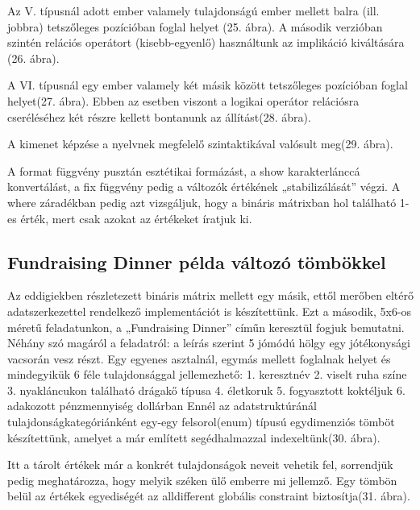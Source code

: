 \documentclass[12pt,a4paper,twoside, openright]{report}
\begin{document}
				
				Az V. típusnál adott ember valamely tulajdonságú ember mellett balra (ill. jobbra) tetszőleges pozícióban foglal helyet (25. ábra). A második verzióban szintén relációs operátort (kisebb-egyenlő) használtunk az implikáció kiváltására (26. ábra).
				
				
				A VI. típusnál egy ember valamely két másik között tetszőleges pozícióban foglal helyet(27. ábra). Ebben az esetben viszont a logikai operátor relációsra cseréléséhez két részre kellett bontanunk az állítást(28. ábra).
				
				
				A kimenet képzése a nyelvnek megfelelő szintaktikával valósult meg(29. ábra).
				
				
				A format függvény pusztán esztétikai formázást, a show karakterlánccá konvertálást, a fix függvény pedig a változók értékének „stabilizálását” végzi. A where záradékban pedig azt vizsgáljuk, hogy a bináris mátrixban hol található 1-es érték, mert csak azokat az értékeket íratjuk ki.
				
			\subsection{Fundraising Dinner példa változó tömbökkel}
				
				Az eddigiekben részletezett bináris mátrix mellett egy másik, ettől merőben eltérő adatszerkezettel rendelkező implementációt is készítettünk. Ezt a második, 5x6-os méretű feladatunkon, a „Fundraising Dinner” címűn keresztül fogjuk bemutatni. Néhány szó magáról a feladatról: a leírás szerint 5 jómódú hölgy egy jótékonysági vacsorán vesz részt. Egy egyenes asztalnál, egymás mellett foglalnak helyet és mindegyikük 6 féle tulajdonsággal jellemezhető:
					1.	keresztnév
					2.	viselt ruha színe
					3.	nyakláncukon található drágakő típusa
					4.	életkoruk
					5.	fogyasztott koktéljuk
					6.	adakozott pénzmennyiség dollárban
				Ennél az adatstruktúránál tulajdonságkategóriánként egy-egy felsorol(enum) típusú egydimenziós tömböt készítettünk, amelyet a már említett segédhalmazzal indexeltünk(30. ábra).
				
				
				Itt a tárolt értékek már a konkrét tulajdonságok neveit vehetik fel, sorrendjük pedig meghatározza, hogy melyik széken ülő emberre mi jellemző. Egy tömbön belül az értékek egyediségét az alldifferent globális constraint biztosítja(31. ábra).
				
\end{document}
